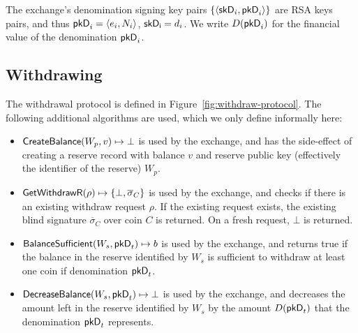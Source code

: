 The exchange's denomination signing key pairs $\{\langle \mathsf{skD}_i, \mathsf{pkD}_i \rangle \}$ are RSA keys pairs,
and thus $\mathsf{pkD}_i = \langle e_i, N_i \rangle$, $\mathsf{skD_i} = d_i$.  We write $D(\mathsf{pkD}_i)$ for the
financial value of the denomination $\mathsf{pkD}_i$.



\subsection{Withdrawing}
The withdrawal protocol is defined in Figure~\ref{fig:withdraw-protocol}.
The following additional algorithms are used, which we only define informally here:
\begin{itemize}
  \item $\mathsf{CreateBalance}(W_p, v) \mapsto \bot$ is used by the exchange,
    and has the side-effect of creating a reserve record with balance $v$
    and reserve public key (effectively the identifier of the reserve) $W_p$.
  \item $\mathsf{GetWithdrawR}(\rho) \mapsto \{\bot,\overline{\sigma}_C\}$
    is used by the exchange, and checks
    if there is an existing withdraw request $\rho$.  If the existing request
    exists, the existing blind signature $\overline{\sigma}_C$ over
    coin $C$ is returned.  On a fresh request, $\bot$ is
    returned.
  \item $\mathsf{BalanceSufficient}(W_s,\mathsf{pkD}_t) \mapsto b$ is used by the exchange, and
    returns true if the balance in the reserve identified by $W_s$ is sufficient to
    withdraw at least one coin if denomination $\mathsf{pkD}_t$.
  \item $\mathsf{DecreaseBalance}(W_s,\mathsf{pkD}_t) \mapsto \bot$ is used by the exchange, and
    decreases the amount left in the reserve identified by $W_s$ by the amount $D(\mathsf{pkD}_t)$
    that the denomination $\mathsf{pkD}_t$ represents.
\end{itemize}

